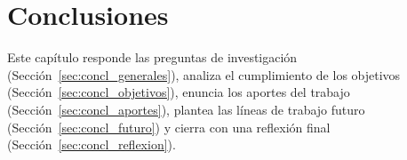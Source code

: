 \chapter[Conclusiones]{Conclusiones}
\label{cp:conclusiones}

Este capítulo responde las preguntas de investigación (Sección~\ref{sec:concl_generales}), analiza el cumplimiento
de los objetivos (Sección~\ref{sec:concl_objetivos}), enuncia los aportes del trabajo
(Sección~\ref{sec:concl_aportes}), plantea las líneas de trabajo futuro (Sección~\ref{sec:concl_futuro}) y cierra con
una reflexión final (Sección~\ref{sec:concl_reflexion}).






